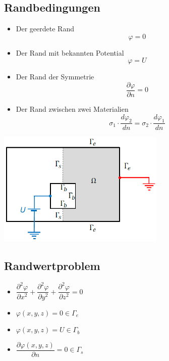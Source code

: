 \subsection{Randbedingungen}
\begin{minipage}{8cm}
	\begin{itemize}
		\item Der geerdete Rand \[\varphi = 0\]
		\item Der Rand mit bekannten Potential \[ \varphi = U \]
		\item Der Rand der Symmetrie \[ \dfrac{\partial\varphi}{\partial n} = 0\]
		\item Der Rand zwischen zwei Materialien \[\sigma_{1} \cdot \frac{d \varphi_{2}}{dn}=\sigma_{2} \cdot \frac{d \varphi_{1}}{dn}\]
	\end{itemize}
\end{minipage}
\begin{minipage}{8cm}
	\includegraphics[width=8cm]{images/randbedinung_ES.png}
\end{minipage}
\subsection{Randwertproblem}
\begin{multicols}{2}
	\begin{itemize}
		\item $\dfrac{\partial^2\varphi}{\partial x^2} +  \dfrac{\partial^2\varphi}{\partial y^2} + \dfrac{\partial^2\varphi}{\partial z^2}=0 $
		\item $\varphi(x,y,z)=0 \in \Gamma_e$
		\item $\varphi(x,y,z)=U \in \Gamma_b$
		\item $ \dfrac{\partial\varphi(x,y,z)}{\partial n} = 0 \in \Gamma_s$
	\end{itemize}
\end{multicols}
\clearpage
\pagebreak